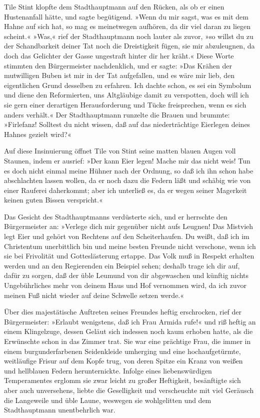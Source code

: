 Tile Stint klopfte dem Stadthauptmann auf den Rücken, als ob er
einen Hustenanfall hätte, und sagte begütigend. »Wenn du mir sagst,
was es mit dem Hahne auf sich hat, so mag es meinetwegen aufhören,
da dir viel daran zu liegen scheint.« »Was,« rief der
Stadthauptmann noch lauter als zuvor, »so willst du zu der
Schandbarkeit deiner Tat noch die Dreistigkeit fügen, sie mir
abzuleugnen, da doch das Gelichter der Gasse ungestraft hinter dir
her kräht.« Diese Worte stimmten den Bürgermeister nachdenklich,
und er sagte: »Das Krähen der mutwilligen Buben ist mir in der Tat
aufgefallen, und es wäre mir lieb, den eigentlichen Grund desselben
zu erfahren. Ich dachte schon, es sei ein Symbolum und diene den
Reformierten, uns Altgläubige damit zu verspotten, doch will ich
sie gern einer derartigen Herausforderung und Tücke freisprechen,
wenn es sich anders verhält.« Der Stadthauptmann runzelte die
Brauen und brummte: »Firlefanz! Solltest du nicht wissen, daß auf
das niederträchtige Eierlegen deines Hahnes gezielt wird?«

Auf diese Insinuierung öffnet Tile von Stint seine matten blauen
Augen voll Staunen, indem er ausrief: \pagenum{[11]} »Der kann Eier
legen! Mache mir das nicht weis! Tun es doch nicht einmal meine
Hühner nach der Ordnung, so daß ich ihn schon habe abschlachten
lassen wollen, da er noch dazu die Federn läßt und schäbig wie von
einer Rauferei daherkommt; aber ich unterließ es, da er wegen
seiner Magerkeit keinen guten Bissen verspricht.«

Das Gesicht des Stadthauptmanns verdüsterte sich, und er herrschte
den Bürgermeister an: »Verlege dich mir gegenüber nicht aufs
Leugnen! Das Mistvieh legt Eier und gehört von Rechtens auf den
Scheiterhaufen. Du weißt, daß ich im Christentum unerbittlich bin
und meine besten Freunde nicht verschone, wenn ich sie bei
Frivolität und Gotteslästerung ertappe. Das Volk muß in Respekt
erhalten werden und an den Regierenden ein Beispiel sehen; deshalb
trage ich dir auf, dafür zu sorgen, daß der üble Leumund von dir
abgewaschen und künftig nichts Ungebührliches mehr von deinem Haus
und Hof vernommen wird, da ich zuvor meinen Fuß nicht wieder auf
deine Schwelle setzen werde.«

Über dies majestätische Auftreten seines Freundes heftig
erschrocken, rief der Bürgermeister: »Erlaubt wenigstens, daß ich
Frau Armida rufe!« und riß heftig an einem Klingelzuge, dessen
Geläut sich indessen noch kaum erhoben hatte, als die Erwünschte
schon in das Zimmer trat. Sie war eine prächtige Frau, die immer in
einem burgunderfarbenen Seidenkleide umherging und eine
hochaufgetürmte, weitläufige Frisur auf dem Kopfe trug, von deren
Spitze ein Kranz von weißen und hellblauen Federn herunternickte.
Infolge eines liebenswürdigen Temperamentes erglomm sie zwar leicht
zu großer Heftigkeit, besänftigte sich aber auch unversehens,
liebte die Geselligkeit und verscheuchte mit viel Geräusch die
\pagenum{[12]} Langeweile und üble Laune, weswegen sie wohlgelitten
und dem Stadthauptmann unentbehrlich war.

